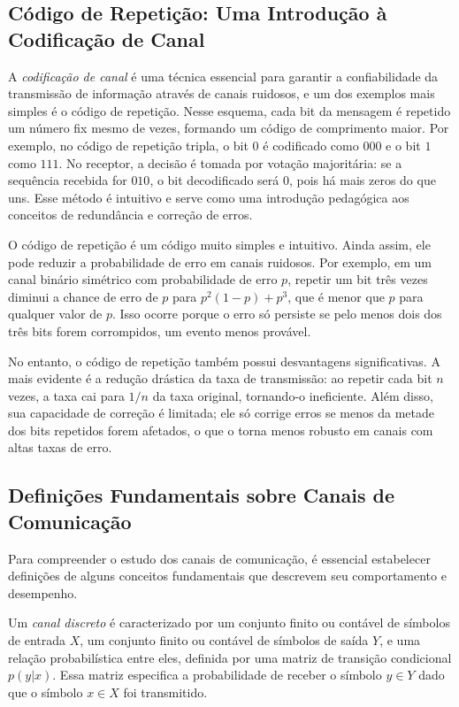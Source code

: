 \subsection{Código de Repetição: Uma Introdução à Codificação de Canal}

A \emph{codificação de canal} é uma técnica essencial para garantir a confiabilidade
da transmissão de informação através de canais ruidosos, e um dos exemplos mais
simples é o código de repetição. Nesse esquema, cada bit da mensagem é
repetido um número fix mesmo de vezes, formando um código de comprimento maior.
Por exemplo, no código de repetição tripla, o bit $0$ é codificado como $000$ e
o bit $1$ como $111$. No receptor, a decisão é tomada por votação majoritária:
se a sequência recebida for $010$, o bit decodificado será $0$, pois há mais
zeros do que uns. Esse método é intuitivo e serve como uma introdução
pedagógica aos conceitos de redundância e correção de erros.

O código de repetição é um código muito simples e intuitivo.
Ainda assim, ele pode reduzir a probabilidade de erro em canais ruidosos. 
Por exemplo, em um canal binário simétrico com probabilidade de erro $p$, repetir um bit
três vezes diminui a chance de erro de $p$ para $p^2(1-p) + p^3$, que é menor
que $p$ para qualquer valor de $p$. Isso ocorre porque o erro só persiste
se pelo menos dois dos três bits forem corrompidos, um evento menos provável.

No entanto, o código de repetição também possui desvantagens significativas. A
mais evidente é a redução drástica da taxa de transmissão: ao repetir cada bit
$n$ vezes, a taxa cai para $1/n$ da taxa original, tornando-o ineficiente.
Além disso, sua capacidade de correção é limitada;
ele só corrige erros se menos da metade dos bits repetidos forem afetados, o
que o torna menos robusto em canais com altas taxas de erro.





\subsection{Definições Fundamentais sobre Canais de Comunicação}

Para compreender o estudo dos canais de comunicação, é
essencial estabelecer definições de alguns conceitos fundamentais que
descrevem seu comportamento e desempenho.

\begin{definition}
  Um \emph{canal discreto} é caracterizado por um conjunto finito ou contável de símbolos de entrada $X$,
  um conjunto finito ou contável de símbolos de saída $Y$, e uma relação probabilística entre eles, definida por
  uma matriz de transição condicional $p(y|x)$. Essa matriz especifica a
  probabilidade de receber o símbolo $y \in Y$ dado que o símbolo $x \in X$ foi transmitido.
\end{definition}

